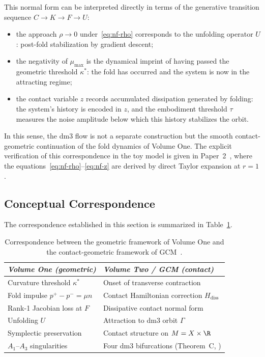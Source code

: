 This normal form can be interpreted directly in terms of the
generative transition sequence $C\to K\to F\to U$:
\begin{itemize}[leftmargin=*]
  \item the approach $\rho\to 0$ under~\eqref{eq:nf-rho}
        corresponds to the unfolding operator $U$: post-fold
        stabilization by gradient descent;
  \item the negativity of $\mu_{\max}$ is the dynamical imprint
        of having passed the geometric threshold $\kappa^*$: the
        fold has occurred and the system is now in the attracting
        regime;
  \item the contact variable $z$ records accumulated dissipation
        generated by folding: the system's history is encoded
        in $z$, and the embodiment threshold $\tau$ measures
        the noise amplitude below which this history stabilizes
        the orbit.
\end{itemize}

In this sense, the dm3 flow is not a separate construction
but the smooth contact-geometric continuation of the fold
dynamics of Volume One. The explicit verification of this
correspondence in the toy model is given in Paper~2~\cite{Paper2},
where the equations~\eqref{eq:nf-rho}--\eqref{eq:nf-z} are
derived by direct Taylor expansion at $r=1$.

\subsection{Conceptual Correspondence}
\label{subsec:correspondence-table}

The correspondence established in this section is summarized
in Table~\ref{tab:correspondence}.

\begin{table}[ht]
\centering
\begin{tabular}{ll}
\toprule
\emph{Volume One (geometric)} & \emph{Volume Two / GCM (contact)} \\
\midrule
Curvature threshold $\kappa^*$ & Onset of transverse contraction \\
Fold impulse $p^+-p^-=\mu n$ & Contact Hamiltonian correction
  $H_{\mathrm{diss}}$ \\
Rank-1 Jacobian loss at $F$ & Dissipative contact normal form \\
Unfolding $U$ & Attraction to dm3 orbit $\Gamma$ \\
Symplectic preservation & Contact structure on $M=X\times\R$ \\
$A_1$--$A_3$ singularities & Four dm3 bifurcations (Theorem~C,
  \cite{Paper2}) \\
\bottomrule
\end{tabular}
\caption{Correspondence between the geometric framework of
  Volume One and the contact-geometric framework of
  GCM~\cite{Paper1,Paper2}.}
\label{tab:correspondence}
\end{table}

